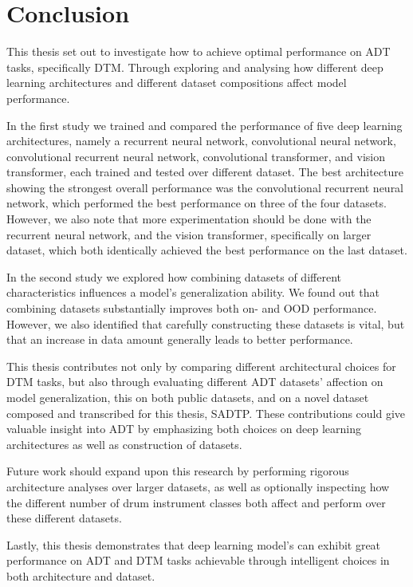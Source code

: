 \chapter{Conclusion}\label{Conclusion}

This thesis set out to investigate how to achieve optimal performance on \acrfull{ADT} tasks, specifically \acrfull{DTM}. Through exploring and analysing how different deep learning architectures and different dataset compositions affect model performance. 

In the first study we trained and compared the performance of five deep learning architectures, namely a recurrent neural network, convolutional neural network, convolutional recurrent neural network, convolutional transformer, and vision transformer, each trained and tested over different dataset. The best architecture showing the strongest overall performance was the convolutional recurrent neural network, which performed the best performance on three of the four datasets. However, we also note that more experimentation should be done with the recurrent neural network, and the vision transformer, specifically on larger dataset, which both identically achieved the best performance on the last dataset.

In the second study we explored how combining datasets of different characteristics influences a model's generalization ability. We found out that combining datasets substantially improves both on- and \acrfull{OOD} performance. However, we also identified that carefully constructing these datasets is vital, but that an increase in data amount generally leads to better performance.

This thesis contributes not only by comparing different architectural choices for \gls{DTM} tasks, but also through evaluating different \gls{ADT} datasets' affection on model generalization, this on both public datasets, and on a novel dataset composed and transcribed for this thesis, SADTP. These contributions could give valuable insight into \gls{ADT} by emphasizing both choices on deep learning architectures as well as construction of datasets.

Future work should expand upon this research by performing rigorous architecture analyses over larger datasets, as well as optionally inspecting how the different number of drum instrument classes both affect and perform over these different datasets.

Lastly, this thesis demonstrates that deep learning model's can exhibit great performance on \gls{ADT} and \gls{DTM} tasks achievable through intelligent choices in both architecture and dataset.